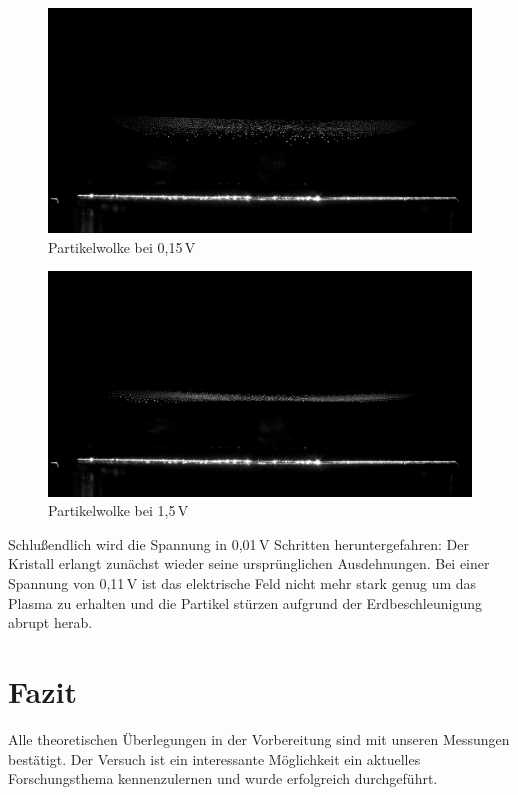 \begin{figure}[ht]
    \centering
    \includegraphics[width=\textwidth]{data/0,15V.jpg}
    \caption{Partikelwolke bei 0,15\,V}
    \label{fig:015v}
\end{figure}

\begin{figure}[ht]
    \centering
    \includegraphics[width=\textwidth]{data/1,5V.jpg}
    \caption{Partikelwolke bei 1,5\,V}
    \label{fig:15v}
\end{figure}

Schlußendlich wird die Spannung in 0,01\,V Schritten heruntergefahren: Der Kristall erlangt zunächst wieder seine ursprünglichen Ausdehnungen. Bei einer Spannung von 0,11\,V ist das elektrische Feld nicht mehr stark genug um das Plasma zu erhalten und die Partikel stürzen aufgrund der Erdbeschleunigung abrupt herab.

\chapter{Fazit}
Alle theoretischen Überlegungen in der Vorbereitung sind mit unseren Messungen bestätigt. Der Versuch ist ein interessante Möglichkeit ein aktuelles Forschungsthema kennenzulernen und wurde erfolgreich durchgeführt.
